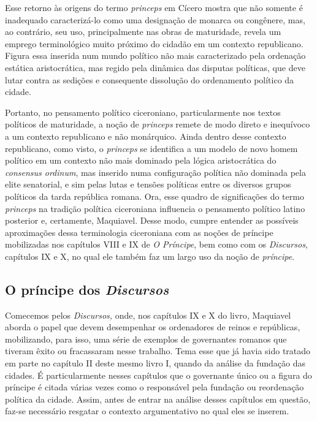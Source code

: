 Esse retorno às origens do termo \emph{princeps} em Cícero mostra que
não somente é inadequado caracterizá-lo como uma designação de monarca
ou congênere, mas, ao contrário, seu uso, principalmente nas obras de
maturidade, revela um emprego terminológico muito próximo do cidadão em
um contexto republicano. Figura essa inserida num mundo político não
mais caracterizado pela ordenação estática aristocrática, mas regido
pela dinâmica das disputas políticas, que deve lutar contra as sedições
e consequente dissolução do ordenamento político da cidade.

Portanto, no pensamento político ciceroniano, particularmente nos textos
políticos de maturidade, a noção de \emph{princeps} remete de modo
direto e inequívoco a um contexto republicano e não monárquico. Ainda
dentro desse contexto republicano, como visto, o \emph{princeps} se
identifica a um modelo de novo homem político em um contexto não mais
dominado pela lógica aristocrática do \emph{consensus ordinum}, mas
inserido numa configuração política não dominada pela elite senatorial,
e sim pelas lutas e tensões políticas entre os diversos grupos políticos
da tarda república romana. Ora, esse quadro de significações do termo
\emph{princeps} na tradição política ciceroniana influencia o pensamento
político latino posterior e, certamente, Maquiavel. Desse modo, cumpre
entender as possíveis aproximações dessa terminologia ciceroniana com as
noções de príncipe mobilizadas nos capítulos VIII e IX de \emph{O
Príncipe}, bem como com os \emph{Discursos}, capítulos IX e X, no qual
ele também faz um largo uso da noção de \emph{príncipe}.

\subsection{O príncipe dos \emph{Discursos}}

Comecemos pelos \emph{Discursos,} onde, nos capítulos IX e X do
livro\emph{,} Maquiavel aborda o papel que devem desempenhar os
ordenadores de reinos e repúblicas, mobilizando, para isso, uma série de
exemplos de governantes romanos que tiveram êxito ou fracassaram nesse
trabalho. Tema esse que já havia sido tratado em parte no capítulo II
deste mesmo livro I, quando da análise da fundação das cidades. É
particularmente nesses capítulos que o governante único ou a figura do
príncipe é citada várias vezes como o responsável pela fundação ou
reordenação política da cidade. Assim, antes de entrar na análise desses
capítulos em questão, faz-se necessário resgatar o contexto
argumentativo no qual eles se inserem.

